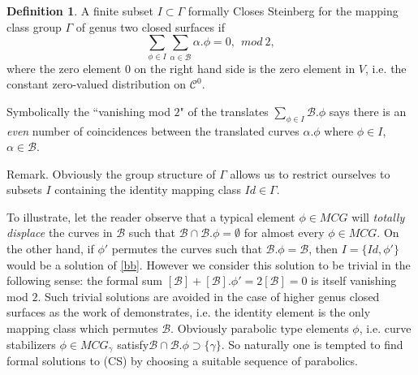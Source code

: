 \documentclass[12pt]{amsart}
\theoremstyle{definition}
\newtheorem{dfn}[thm]{Definition}
\theoremstyle{remark}
\newcommand{\sB}{\mathscr{B}}
\newcommand{\sC}{\mathscr{C}}
\begin{document}
\begin{dfn}
A finite subset $I\subset \Gamma$ formally Closes Steinberg for the mapping class group $\Gamma$ of genus two closed surfaces if 
\begin{equation}
\label{bb}
\sum_{\phi\in I} \sum_{\alpha\in \sB}\alpha.\phi=0, ~~mod~2,
\end{equation}
where the zero element $0$ on the right hand side is the zero element in $V$, i.e. the constant zero-valued distribution on $\sC^0$. 
\end{dfn}

Symbolically the ``vanishing mod $2$" of the translates $\sum_{\phi\in I} \sB.\phi$ says there is an \emph{even} number of coincidences between the translated curves $\alpha.\phi$ where $\phi\in I$, $\alpha\in \sB$. 

Remark. Obviously the group structure of $\Gamma$ allows us to restrict ourselves to subsets $I$ containing the identity mapping class $Id\in \Gamma$. 

To illustrate, let the reader observe that a typical element $\phi\in MCG$ will \emph{totally displace} the curves in $\sB$ such that $\sB \cap \sB.\phi=\emptyset$ for almost every $\phi\in MCG$. On the other hand, if $\phi'$ permutes the curves such that $\sB.\phi=\sB$, then $I=\{Id,\phi'\}$ would be a solution of \eqref{bb}. However we consider this solution to be trivial in the following sense: the formal sum $[\sB]+[\sB].\phi'=2[\sB]=0$ is itself vanishing mod $2$. Such trivial solutions are avoided in the case of higher genus closed surfaces as the work of \cite{birman2013finite} demonstrates, i.e. the identity element is the only mapping class which permutes $\sB$. Obviously parabolic type elements $\phi$, i.e. curve stabilizers $\phi\in MCG_\gamma$ satisfy$\sB \cap \sB.\phi \supset \{\gamma\}$. So naturally one is tempted to find formal solutions to (CS) by choosing a suitable sequence of parabolics. 
\end{document}

